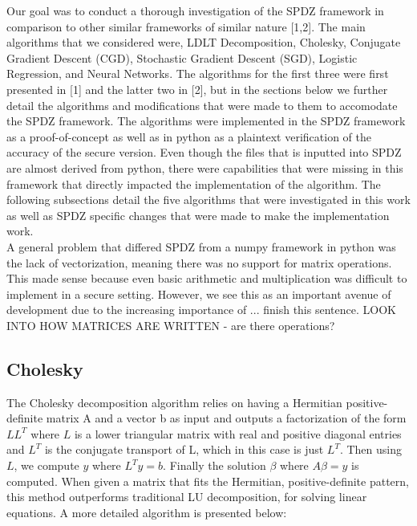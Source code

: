 \documentclass{article}
\theoremstyle{plain}
\theoremstyle{definition}
\theoremstyle{remark}
\begin{document}
Our goal was to conduct a thorough investigation of the SPDZ framework in comparison to other similar frameworks of similar nature [1,2]. The main algorithms that we considered were, LDLT Decomposition, Cholesky, Conjugate Gradient Descent (CGD), Stochastic Gradient Descent (SGD), Logistic Regression, and Neural Networks. The algorithms for the first three were first presented in [1] and the latter two in [2], but in the sections below we further detail the algorithms and modifications that were made to them to accomodate the SPDZ framework. The algorithms were implemented in the SPDZ framework as a proof-of-concept as well as in python as a plaintext verification of the accuracy of the secure version. Even though the files that is inputted into SPDZ are almost derived from python, there were capabilities that were missing in this framework that directly impacted the implementation of the algorithm. The following subsections detail the five algorithms that were investigated in this work as well as SPDZ specific changes that were made to make the implementation work. \\

\noindent
A general problem that differed SPDZ from a numpy framework in python was the lack of  vectorization, meaning there was no support for matrix operations. This made sense because even basic arithmetic and multiplication was difficult to implement in a secure setting. However, we see this as an important avenue of development due to the increasing importance of ... finish this sentence. LOOK INTO HOW MATRICES ARE WRITTEN - are there operations?

\subsection{Cholesky}

The Cholesky decomposition algorithm relies on having a Hermitian positive-definite matrix A and a vector b as input and outputs a factorization of the form $LL^T$ where $L$ is a lower triangular matrix with real and positive diagonal entries and $L^T$ is the conjugate transport of L, which in this case is just $L^T$. Then using $L$, we compute $y$ where $L^Ty = b$. Finally the solution $\beta$ where $A\beta = y$ is computed. When given a matrix that fits the Hermitian, positive-definite pattern, this method outperforms traditional LU decomposition, for solving linear equations. A more detailed algorithm is presented below: 
\end{document}
